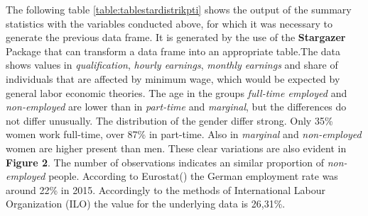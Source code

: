 \documentclass[a4paper]{article}
\begin{document}
The following table \ref{table:tablestardistrikpti} shows the output of the summary statistics with the variables conducted above, for which it was necessary to generate the previous data frame. It is generated by the use of the \textbf{Stargazer} Package that can transform a data frame into an appropriate table.\linebreak \linebreak The data shows values in \textit{qualification}, \textit{hourly earnings}, \textit{monthly earnings} and share of individuals that are affected by minimum wage, which would be expected by general labor economic theories. The age in the groups \textit{full-time employed} and \textit{non-employed} are lower than in \textit{part-time} and \textit{marginal}, but the differences do not differ unusually. The distribution of the gender differ strong. Only 35\% women work full-time, over 87\% in part-time. Also in \textit{marginal} and \textit{non-employed} women are higher present than men. These clear variations are also evident in \textbf{Figure 2}. The number of observations indicates an similar proportion of \textit{non-employed} people. According to Eurostat(\cite{eurostat}) the German employment rate was around 22\% in 2015. Accordingly to the methods of International Labour Organization (ILO) the value for the underlying data is 26,31\%. 
\end{document}
